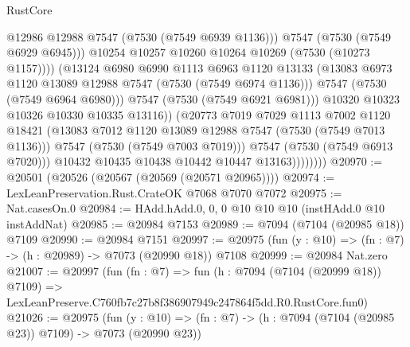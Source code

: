 \begin{lexlean}{RustCore}
\begin{coremodule}
                                    @12986
                                    @12988
                                    @7547
                                    (@7530 (@7549 @6939 @1136)))
                                  @7547
                                  (@7530 (@7549 @6929 @6945)))
                                @10254
                                @10257
                                @10260
                                @10264
                                @10269
                                (@7530 (@10273 @1157))))
                            (@13124
                              @6980
                              @6990
                              @1113
                              @6963
                              @1120
                              @13133
                              (@13083 @6973 @1120 @13089 @12988 @7547 (@7530 (@7549 @6974 @1136)))
                              @7547
                              (@7530 (@7549 @6964 @6980)))
                            @7547
                            (@7530 (@7549 @6921 @6981)))
                          @10320
                          @10323
                          @10326
                          @10330
                          @10335
                          @13116))
                      (@20773
                        @7019
                        @7029
                        @1113
                        @7002
                        @1120
                        @18421
                        (@13083 @7012 @1120 @13089 @12988 @7547 (@7530 (@7549 @7013 @1136)))
                        @7547
                        (@7530 (@7549 @7003 @7019)))
                      @7547
                      (@7530 (@7549 @6913 @7020)))
                    @10432
                    @10435
                    @10438
                    @10442
                    @10447
                    @13163))))))))
@20970 := @20501 (@20526 (@20567 (@20569 (@20571 @20965))))
@20974 := LexLeanPreservation.Rust.CrateOK @7068 @7070 @7072
@20975 := Nat.casesOn.{0}
@20984 := HAdd.hAdd.{0, 0, 0} @10 @10 @10 (instHAdd.{0} @10 instAddNat)
@20985 := @20984 @7153
@20989 := @7094 (@7104 (@20985 @18)) @7109
@20990 := @20984 @7151
@20997 := @20975 (fun (y : @10) => (fn : @7) -> (h : @20989) -> @7073 (@20990 @18)) @7108
@20999 := @20984 Nat.zero
@21007 := @20997
    (fun (fn : @7) =>
    fun (h : @7094 (@7104 (@20999 @18)) @7109) =>
    LexLeanPreserve.C760fb7c27b8f386907949c247864f5dd.R0.RustCore.fun0)
@21026 := @20975
    (fun (y : @10) => (fn : @7) -> (h : @7094 (@7104 (@20985 @23)) @7109) -> @7073 (@20990 @23))

\end{coremodule}
\end{lexlean}
